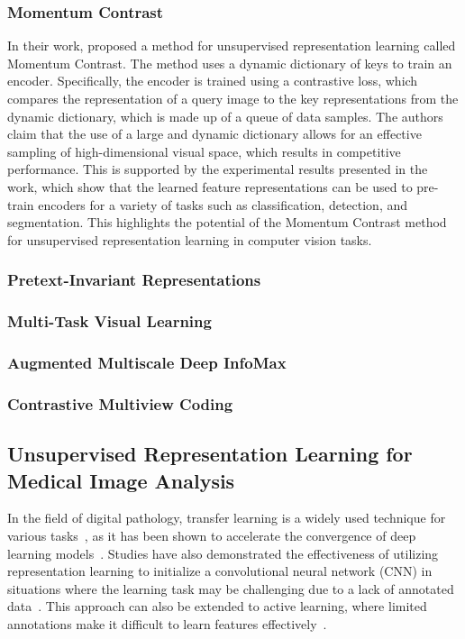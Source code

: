 \subsubsection{Momentum Contrast}
\label{subsubsec:momentum_contrast}
In their work, \cite{he2020momentum} proposed a method for unsupervised representation learning called Momentum Contrast. The method uses a dynamic dictionary of keys to train an encoder. Specifically, the encoder is trained using a contrastive loss, which compares the representation of a query image to the key representations from the dynamic dictionary, which is made up of a queue of data samples. The authors claim that the use of a large and dynamic dictionary allows for an effective sampling of high-dimensional visual space, which results in competitive performance. This is supported by the experimental results presented in the work, which show that the learned feature representations can be used to pre-train encoders for a variety of tasks such as classification, detection, and segmentation. This highlights the potential of the Momentum Contrast method for unsupervised representation learning in computer vision tasks.

\subsubsection{Pretext-Invariant Representations}
\label{subsubsec:pretext_invariant_representations}

\subsubsection{Multi-Task Visual Learning}
\label{subsubsec:multi-task_visual_learning}

\subsubsection{Augmented Multiscale Deep InfoMax}
\label{subsubsec:AMDIM}

\subsubsection{Contrastive Multiview Coding}
\label{subsubsec:contrastive_multiview_coding}

\subsection{Unsupervised Representation Learning for \\Medical Image Analysis}
\label{subsec:unsupervise_representation_for_medical}
In the field of digital pathology, transfer learning is a widely used technique for various tasks~\citep{srinidhi2020deep}, as it has been shown to accelerate the convergence of deep learning models~\citep{bayramoglu2016transfer}. Studies have also demonstrated the effectiveness of utilizing representation learning to initialize a convolutional neural network (CNN) in situations where the learning task may be challenging due to a lack of annotated data~\citep{hou2016automatic}. This approach can also be extended to active learning, where limited annotations make it difficult to learn features effectively~\cite{carse2019active}.

